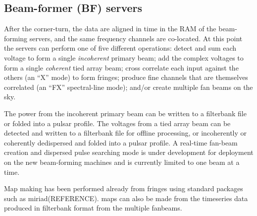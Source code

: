\subsection{Beam-former (BF) servers}

After the corner-turn, the data are aligned in time in the RAM of the beam-forming servers, and the same frequency channels are co-located. At this point the servers can perform one of five different operations: detect and sum each voltage to form a single \textit{incoherent} primary beam; add the complex voltages to form a single \textit{coherent} tied array beam; cross correlate each input against the others (an ``X'' mode) to form fringes; produce fine channels that are themselves correlated (an ``FX'' spectral-line mode); and/or  create multiple fan beams on the sky. 

The power from the incoherent primary beam can be written to a filterbank file or folded into a pulsar profile. The voltages from a tied array beam can be detected and written to a filterbank file for offline processing, or incoherently or coherently dedispersed and folded into a pulsar profile. A real-time fan-beam creation and dispersed pulse searching mode is under development for deployment on the new beam-forming machines and is currently limited to one beam at a time.

Map making has been performed already from fringes using standard packages such as miriad(REFERENCE). maps can also be made from the timeseries data produced in filterbank format from the multiple fanbeams. 
  